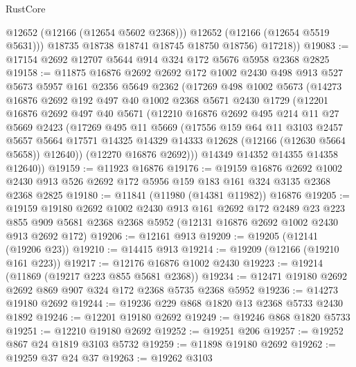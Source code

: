 \begin{lexlean}{RustCore}
\begin{coremodule}
              @12652
              (@12166 (@12654 @5602 @2368)))
            @12652
            (@12166 (@12654 @5519 @5631)))
          @18735
          @18738
          @18741
          @18745
          @18750
          @18756)
        @17218))
@19083 := @17154 @2692 @12707 @5644 @914 @324 @172 @5676 @5958 @2368 @2825
@19158 := @11875
    @16876
    @2692
    @2692
    @172
    @1002
    @2430
    @498
    @913
    @527
    @5673
    @5957
    @161
    @2356
    @5649
    @2362
    (@17269
      @498
      @1002
      @5673
      (@14273
        @16876
        @2692
        @192
        @497
        @40
        @1002
        @2368
        @5671
        @2430
        @1729
        (@12201
          @16876
          @2692
          @497
          @40
          @5671
          (@12210
            @16876
            @2692
            @495
            @214
            @11
            @27
            @5669
            @2423
            (@17269
              @495
              @11
              @5669
              (@17556
                @159
                @64
                @11
                @3103
                @2457
                @5657
                @5664
                @17571
                @14325
                @14329
                @14333
                @12628
                (@12166 (@12630 @5664 @5658))
                @12640))
            (@12270 @16876 @2692)))
        @14349
        @14352
        @14355
        @14358
        @12640))
@19159 := @11923 @16876
@19176 := @19159
    @16876
    @2692
    @1002
    @2430
    @913
    @526
    @2692
    @172
    @5956
    @159
    @183
    @161
    @324
    @3135
    @2368
    @2368
    @2825
@19180 := @11841 (@11980 (@14381 @11982)) @16876
@19205 := @19159
    @19180
    @2692
    @1002
    @2430
    @913
    @161
    @2692
    @172
    @2489
    @23
    @223
    @855
    @909
    @5681
    @2368
    @2368
    @5952
    (@12131 @16876 @2692 @1002 @2430 @913 @2692 @172)
@19206 := @12161 @913
@19209 := @19205 (@12141 (@19206 @23))
@19210 := @14415 @913
@19214 := @19209 (@12166 (@19210 @161 @223))
@19217 := @12176 @16876 @1002 @2430
@19223 := @19214 (@11869 (@19217 @223 @855 @5681 @2368))
@19234 := @12471 @19180 @2692 @2692 @869 @907 @324 @172 @2368 @5735 @2368 @5952
@19236 := @14273 @19180 @2692
@19244 := @19236 @229 @868 @1820 @13 @2368 @5733 @2430 @1892
@19246 := @12201 @19180 @2692
@19249 := @19246 @868 @1820 @5733
@19251 := @12210 @19180 @2692
@19252 := @19251 @206
@19257 := @19252 @867 @24 @1819 @3103 @5732
@19259 := @11898 @19180 @2692
@19262 := @19259 @37 @24 @37
@19263 := @19262 @3103

\end{coremodule}
\end{lexlean}
